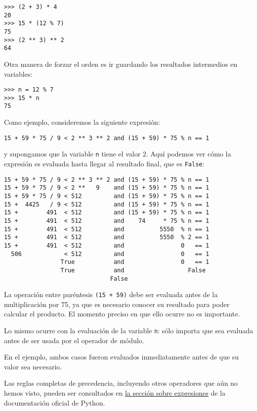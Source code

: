 \begin{lstlisting}
>>> (2 + 3) * 4
20
>>> 15 * (12 % 7)
75
>>> (2 ** 3) ** 2
64
\end{lstlisting}

Otra manera de forzar el orden es ir guardando los resultados
intermedios en variables:

\begin{lstlisting}
>>> n = 12 % 7
>>> 15 * n
75
\end{lstlisting}

Como ejemplo, consideremos la siguiente expresión:

\begin{lstlisting}
15 + 59 * 75 / 9 < 2 ** 3 ** 2 and (15 + 59) * 75 % n == 1
\end{lstlisting}

y supongamos que la variable \lstinline!n! tiene el valor 2. Aquí
podemos ver cómo la expresión es evaluada hasta llegar al resultado
final, que es \lstinline!False!:

\begin{lstlisting}
15 + 59 * 75 / 9 < 2 ** 3 ** 2 and (15 + 59) * 75 % n == 1
15 + 59 * 75 / 9 < 2 **   9    and (15 + 59) * 75 % n == 1
15 + 59 * 75 / 9 < 512         and (15 + 59) * 75 % n == 1
15 +  4425   / 9 < 512         and (15 + 59) * 75 % n == 1
15 +        491  < 512         and (15 + 59) * 75 % n == 1
15 +        491  < 512         and    74     * 75 % n == 1
15 +        491  < 512         and          5550  % n == 1
15 +        491  < 512         and          5550  % 2 == 1
15 +        491  < 512         and                0   == 1
  506            < 512         and                0   == 1
                True           and                0   == 1
                True           and                  False
                              False
\end{lstlisting}

La operación entre paréntesis \lstinline!(15 + 59)! debe ser evaluada
antes de la multiplicación por 75, ya que es necesario conocer su
resultado para poder calcular el producto. El momento preciso en que
ello ocurre no es importante.

Lo mismo ocurre con la evaluación de la variable \lstinline!n!: sólo
importa que sea evaluada antes de ser usada por el operador de módulo.

En el ejemplo, ambos casos fueron evaluados inmediatamente antes de que
su valor sea necesario.

Las reglas completas de precedencia, incluyendo otros operadores que aún
no hemos visto, pueden ser consultados en
\href{http://docs.python.org/reference/expressions.html\#summary}{la
sección sobre expresiones} de la documentación oficial de Python.

